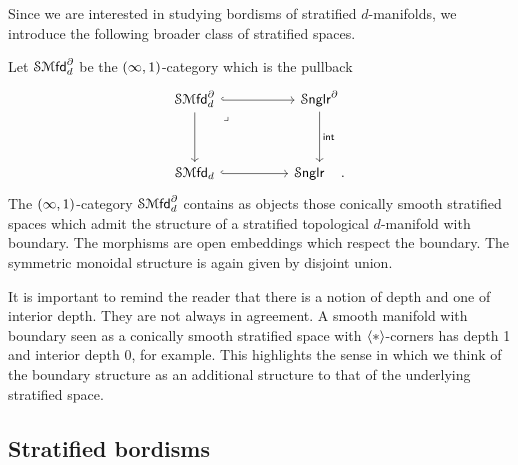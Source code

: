 Since we are interested in studying bordisms of stratified $d$-manifolds, we introduce the following broader class of stratified spaces.

\begin{definition}
    Let ${\mathcal S\!\operatorname{{\mathcal M}\mathsf{fd}}}_{d}^{\partial}$ be the $(\operatorname{\infty},1)$-category which is the pullback 
    \begin{equation}
        \begin{tikzcd}[ampersand replacement=\&]
            {\SMfd_{d}^{\partial}} \&\& {\Snglr^{\partial}} \\
            \\
            {\SMfd_{d}} \&\& \Snglr \quad .
            \arrow[hook, from=1-1, to=1-3]
            \arrow[from=1-1, to=3-1]
            \arrow["\lrcorner"{anchor=center, pos=0.125}, draw=none, from=1-1, to=3-3]
            \arrow["{\mathsf{int}}", from=1-3, to=3-3]
            \arrow[hook, from=3-1, to=3-3]
        \end{tikzcd}
    \end{equation} 
    The $(\operatorname{\infty},1)$-category ${\mathcal S\!\operatorname{{\mathcal M}\mathsf{fd}}}_d^{\partial}$ contains as objects those conically smooth stratified spaces which admit the structure of a stratified topological $d$-manifold with boundary. The morphisms are open embeddings which respect the boundary. The symmetric monoidal structure is again given by disjoint union.
\end{definition}

\begin{remark}
    It is important to remind the reader that there is a notion of depth and one of interior depth. They are not always in agreement. A smooth manifold with boundary seen as a conically smooth stratified space with $\langle * \rangle$-corners has depth 1 and interior depth 0, for example. This highlights the sense in which we think of the boundary structure as an additional structure to that of the underlying stratified space.
\end{remark}

\subsection{Stratified bordisms}

